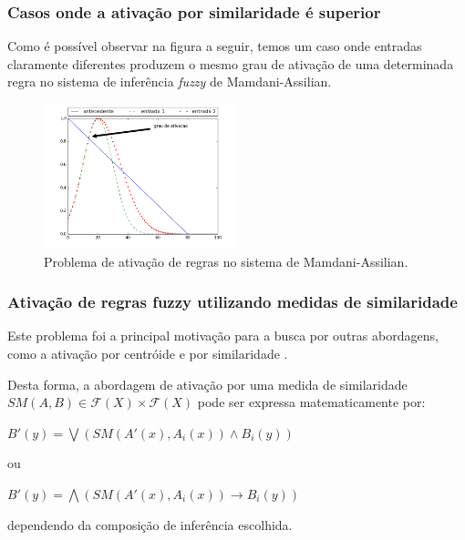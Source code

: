 \documentclass{beamer}
\theoremstyle{definition}
\begin{document}
\begin{frame}
\frametitle{Casos onde a ativação por similaridade é superior}
Como é possível observar na figura a seguir, temos um caso onde entradas claramente diferentes produzem o mesmo grau de ativação de uma determinada regra no sistema de inferência \textit{fuzzy} de Mamdani-Assilian.\par
\begin{figure}[H]
 \centering
  \includegraphics[width=0.5\textwidth]{ativacao_mamdani.png}
  \caption{Problema de ativação de regras no sistema de Mamdani-Assilian.}
  \label{fig:problema_mamdani}
\end{figure}
\end{frame}

\begin{frame}
\frametitle{Ativação de regras fuzzy utilizando medidas de similaridade}
Este problema foi a principal motivação para a busca por outras abordagens, como a ativação por centróide \cite{p12} \cite{p13} e por similaridade \cite{p8}.\par
Desta forma, a abordagem de ativação por uma medida de similaridade $SM(A,B) \in \mathcal{F}(X)\times\mathcal{F}(X)$ pode ser expressa matematicamente por:
\begin{center}
$B'(y) = \bigvee (SM(A'(x),A_{i}(x)) \wedge B_{i}(y))$
\end{center}
\begin{center}
ou
\end{center}
\begin{center}
$B'(y) = \bigwedge (SM(A'(x),A_{i}(x)) \rightarrow B_{i}(y))$
\end{center}
dependendo da composição de inferência escolhida.
\end{frame}
\end{document}
